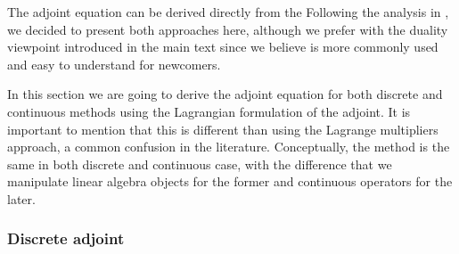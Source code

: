 \label{appendix:lagrangian}


The adjoint equation can be derived directly from the 
Following the analysis in \cite{Giles_Pierce_2000}, we decided to present both approaches here, although we prefer with the duality viewpoint introduced in the main text since we believe is more commonly used and easy to understand for newcomers. 

In this section we are going to derive the adjoint equation for both discrete and continuous methods using the Lagrangian formulation of the adjoint. 
It is important to mention that this is different than using the Lagrange multipliers approach, a common confusion in the literature\cite{Givoli_2021}.
Conceptually, the method is the same in both discrete and continuous case, with the difference that we manipulate linear algebra objects for the former and continuous operators for the later. 

\subsubsection{Discrete adjoint}

